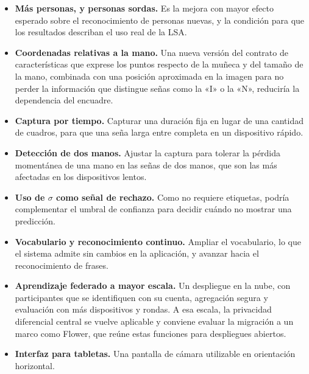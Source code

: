 \begin{itemize}
    \item \textbf{Más personas, y personas sordas.} Es la mejora con mayor efecto esperado sobre el reconocimiento de personas nuevas, y la condición para que los resultados describan el uso real de la LSA.
    \item \textbf{Coordenadas relativas a la mano.} Una nueva versión del contrato de características que exprese los puntos respecto de la muñeca y del tamaño de la mano, combinada con una posición aproximada en la imagen para no perder la información que distingue señas como la «I» o la «N», reduciría la dependencia del encuadre.
    \item \textbf{Captura por tiempo.} Capturar una duración fija en lugar de una cantidad de cuadros, para que una seña larga entre completa en un dispositivo rápido.
    \item \textbf{Detección de dos manos.} Ajustar la captura para tolerar la pérdida momentánea de una mano en las señas de dos manos, que son las más afectadas en los dispositivos lentos.
    \item \textbf{Uso de $\sigma$ como señal de rechazo.} Como no requiere etiquetas, podría complementar el umbral de confianza para decidir cuándo no mostrar una predicción.
    \item \textbf{Vocabulario y reconocimiento continuo.} Ampliar el vocabulario, lo que el sistema admite sin cambios en la aplicación, y avanzar hacia el reconocimiento de frases.
    \item \textbf{Aprendizaje federado a mayor escala.} Un despliegue en la nube, con participantes que se identifiquen con su cuenta, agregación segura y evaluación con más dispositivos y rondas. A esa escala, la privacidad diferencial central se vuelve aplicable y conviene evaluar la migración a un marco como Flower, que reúne estas funciones para despliegues abiertos.
    \item \textbf{Interfaz para tabletas.} Una pantalla de cámara utilizable en orientación horizontal.
\end{itemize}
